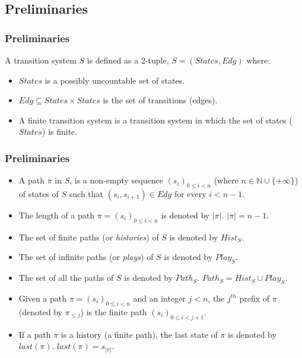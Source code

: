 \documentclass{beamer}
\begin{document}
\subsection*{Preliminaries}
\begin{frame}
\frametitle{Preliminaries}
\begin{definition}
A transition system $S$ is defined as a 2-tuple, $S = (States, Edg)$ where:
\begin{itemize}
\item $States$ is a possibly uncountable set of states.
\item $Edg \subseteq States \times States$ is the set of transitions (edges).
\end{itemize}
\end{definition}
\begin{itemize}
\item A finite transition system is a transition system in which the set of states ($States$) is finite.
\end{itemize}
\end{frame}

\begin{frame}
\frametitle{Preliminaries}
\begin{itemize}
\item A path $\pi$ in $S$, is a non-empty sequence $(s_{i})_{0\leq i<n}$ (where $n \in \mathbb{N} \cup \lbrace +\infty \rbrace$) of states of $S$ such that $(s_{i}, s_{i+1}) \in Edg$ for every $i < n-1$.
\item The length of a path $\pi = (s_{i})_{0\leq i<n}$ is denoted by $\vert \pi \vert$. $\vert \pi \vert = n-1$.
\item The set of finite paths (or \textit{histories}) of $S$ is denoted by $Hist_{S}$.
\item The set of infinite paths (or \textit{plays}) of $S$ is denoted by $Play_{S}$.
\item The set of all the paths of $S$ is denoted by $Path_{S}$. $Path_{S} = Hist_{S} \cup Play_{S}$.
\item Given a path $\pi = (s_{i})_{0\leq i<n}$ and an integer $j < n$, the $j^{th}$ prefix of $\pi$ (denoted by $\pi_{\leq j}$) is the finite path $(s_{i})_{0\leq i<j+1}$.
\item If a path $\pi$ is a history (a finite path), the last state of $\pi$ is denoted by $last(\pi)$. $last(\pi) = s_{\vert \pi \vert}$.    
\end{itemize}
\end{frame}
\end{document}
